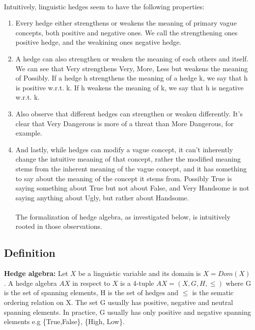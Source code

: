 \documentclass[part1.tex]{subfiles}
\begin{document}
\paragraph{} Intuitively, linguistic hedges seem to have the following properties:
\begin{enumerate}
  \item Every hedge either strengthens or weakens the meaning of
    primary vague concepts, both positive and negative ones. We
    call the strengthening ones positive hedge, and the weakining
    ones negative hedge.
  \item A hedge can also strengthen or weaken the meaning of each
    others and itself. We can see that Very strengthens Very,
    More, Less but weakens the meaning of Possibly. If a hedge h
    strengthens the meaning of a hedge k, we say that h is
    positive w.r.t. k. If h weakens the meaning of k, we say that
    h is negative w.r.t. k.
  \item Also observe that different hedges can strengthen or
    weaken differently. It's clear that Very Dangerous is more of
    a threat than More Dangerous, for example.
  \item And lastly, while hedges can modify a vague concept, it
    can't inherently change the intuitive meaning of that
    concept, rather the modified meaning stems from the inherent
    meaning of the vague concept, and it has something to say about
    the meaning of the concept it stems from. Possibly True is
    saying something about True but not about False, and Very
    Handsome is not saying anything about Ugly, but rather about
    Handsome.
\paragraph{} The formalization of hedge algebra, as investigated
below, is intuitively rooted in those observations.
\end{enumerate}
\subsection{Definition}

{\bfseries Hedge algebra:} Let \(X\) be a linguistic variable and its domain is \(X = Dom(X)\). A hedge 
algebra \(AX\) in respect to \(X\) is a 4-tuple \(AX = (X,G,H,\le)\) where G is the set of spanning
elements, H is the set of hedges and \(\le\) is the sematic ordering relation on X.
The set G usually has positive, negative and neutral spanning elements. In practice, G usually has only
positive and negative spanning elements e.g \{True,False\}, \{High, Low\}.\\
\end{document}
